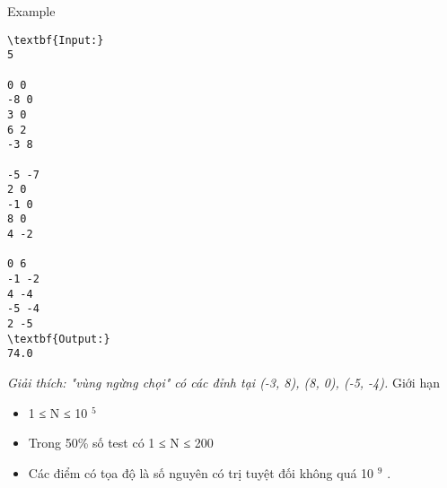 Example
\begin{verbatim}
\textbf{Input:}
5

0 0
-8 0
3 0
6 2
-3 8

-5 -7
2 0
-1 0
8 0
4 -2

0 6
-1 -2
4 -4
-5 -4
2 -5
\textbf{Output:}
74.0\end{verbatim}

\emph{    Giải thích: "vùng ngừng chọi" có các đỉnh tại (-3, 8), (8, 0), (-5, -4).   }
Giới hạn
\begin{itemize}
	\item     1 ≤ N ≤ 10    $^     5    $
	\item     Trong 50\% số test có 1 ≤ N ≤ 200   
	\item     Các điểm có tọa độ là số nguyên có trị tuyệt đối không quá 10    $^     9    $    .   
\end{itemize}